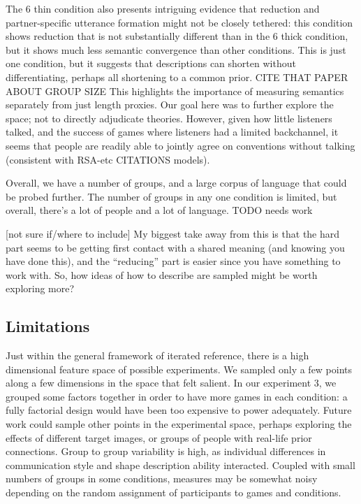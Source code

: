 \documentclass[
  english,
  a4paper,
]{article}
\begin{document}
The 6 thin condition also presents intriguing evidence that reduction and partner-specific utterance formation might not be closely tethered: this condition shows reduction that is not substantially different than in the 6 thick condition, but it shows much less semantic convergence than other conditions. This is just one condition, but it suggests that descriptions can shorten without differentiating, perhaps all shortening to a common prior. CITE THAT PAPER ABOUT GROUP SIZE This highlights the importance of measuring semantics separately from just length proxies.
Our goal here was to further explore the space; not to directly adjudicate theories. However, given how little listeners talked, and the success of games where listeners had a limited backchannel, it seems that people are readily able to jointly agree on conventions without talking (consistent with RSA-etc CITATIONS models).

Overall, we have a number of groups, and a large corpus of language that could be probed further. The number of groups in any one condition is limited, but overall, there's a lot of people and a lot of language. TODO needs work

{[}not sure if/where to include{]} My biggest take away from this is that the hard part seems to be getting first contact with a shared meaning (and knowing you have done this), and the ``reducing'' part is easier since you have something to work with. So, how ideas of how to describe are sampled might be worth exploring more?

\hypertarget{limitations}{%
\subsection{Limitations}\label{limitations}}

Just within the general framework of iterated reference, there is a high dimensional feature space of possible experiments. We sampled only a few points along a few dimensions in the space that felt salient. In our experiment 3, we grouped some factors together in order to have more games in each condition: a fully factorial design would have been too expensive to power adequately. Future work could sample other points in the experimental space, perhaps exploring the effects of different target images, or groups of people with real-life prior connections. Group to group variability is high, as individual differences in communication style and shape description ability interacted. Coupled with small numbers of groups in some conditions, measures may be somewhat noisy depending on the random assignment of participants to games and conditions.
\end{document}
